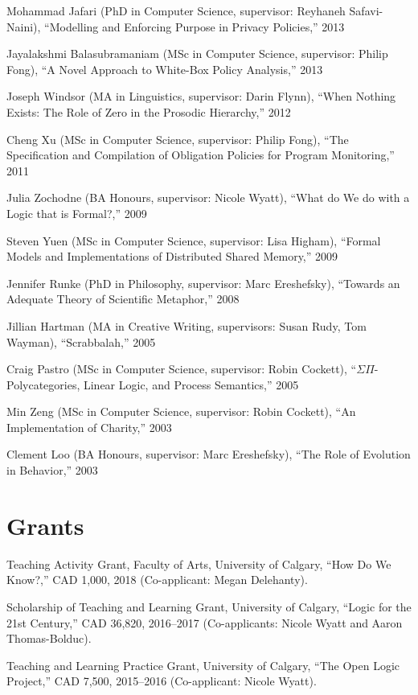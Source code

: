 \documentclass[11pt]{article}
\begin{document}
\ind Mohammad Jafari (PhD in Computer Science, supervisor: Reyhaneh Safavi-Naini), ``Modelling and Enforcing Purpose in Privacy Policies,'' 2013

\ind Jayalakshmi Balasubramaniam (MSc in Computer Science, supervisor: Philip Fong), ``A Novel Approach to White-Box Policy Analysis,'' 2013

\ind Joseph Windsor (MA in Linguistics, supervisor: Darin Flynn), ``When Nothing Exists: The Role of Zero in the Prosodic Hierarchy,'' 2012

\ind Cheng Xu (MSc in Computer Science, supervisor: Philip Fong), ``The Specification and Compilation of Obligation Policies for Program
Monitoring,'' 2011

\ind Julia Zochodne (BA Honours, supervisor: Nicole Wyatt), ``What do We do with a Logic that is Formal?,'' 2009

\ind Steven Yuen (MSc in Computer Science, supervisor: Lisa Higham), ``Formal Models and Implementations of Distributed Shared Memory,'' 2009

\ind Jennifer Runke (PhD in Philosophy, supervisor: Marc Ereshefsky), ``Towards an Adequate Theory of Scientific Metaphor,'' 2008

\ind Jillian Hartman (MA in Creative Writing, supervisors: Susan Rudy, Tom Wayman), ``Scrabbalah,'' 2005

\ind Craig Pastro (MSc in Computer Science, supervisor: Robin Cockett), ``\(\Sigma\Pi\)-Polycategories, Linear Logic, and Process Semantics,'' 2005

\ind Min Zeng (MSc in Computer Science, supervisor: Robin Cockett), ``An Implementation of Charity,'' 2003

\ind Clement Loo (BA Honours, supervisor: Marc Ereshefsky), ``The Role of Evolution in Behavior,'' 2003


\section{Grants}

\ind Teaching Activity Grant, Faculty of Arts, University of Calgary, ``How Do We Know?,'' CAD 1,000, 2018 (Co-applicant: Megan Delehanty).

\ind Scholarship of Teaching and Learning Grant, University of Calgary, ``Logic for the 21st Century,'' CAD 36,820, 2016--2017 (Co-applicants: Nicole Wyatt and Aaron Thomas-Bolduc).

\ind Teaching and Learning Practice Grant, University of Calgary, ``The Open Logic Project,'' CAD 7,500, 2015--2016 (Co-applicant: Nicole Wyatt).
\end{document}
